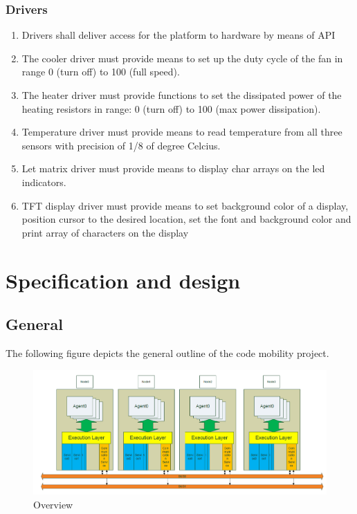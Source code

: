 \documentclass{scrreprt}
\begin{document}
\subsection{Drivers}
\renewcommand{\labelenumi}{R_LL_DRV_\arabic{enumi}}
\begin{enumerate}
\item Drivers shall deliver access for the platform to hardware by means of API
\item The cooler driver must provide means to set up the duty cycle of the fan in range 0 (turn off) to 100 (full speed).
\item The heater driver must provide functions to set the dissipated power of the heating resistors in range:
	0 (turn off) to 100 (max power dissipation).
\item Temperature driver must provide means to read temperature from all three sensors with precision of 1/8 of degree Celcius.
\item Let matrix driver must provide means to display char arrays on the led indicators.
\item TFT display driver must provide means to set background color of a display, position cursor to the desired location,
	set the font and background color and print array of characters on the display
\end{enumerate}



\chapter{Specification and design}
\label{ch:spec}
\section{General}

The following figure depicts the general outline of the code mobility project.

\begin{figure}[!htb]
\includegraphics[scale=0.4]{figures/global.png}
\caption{Overview}
\end{figure}
\end{document}

